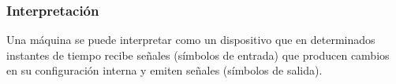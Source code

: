 \subsubsection{Interpretación}
Una máquina se puede interpretar como un dispositivo que en determinados instantes de tiempo recibe señales (símbolos de entrada) que producen cambios en su configuración interna y emiten señales (símbolos de salida).
\begin{center}
\end{center}
